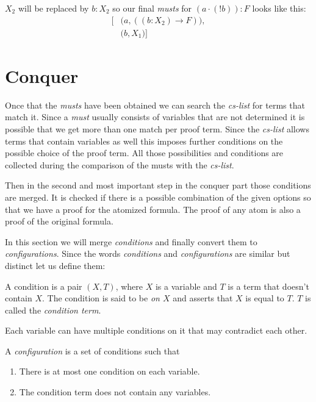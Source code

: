 $X_2$ will be replaced by $b:X_2$ so our final \emph{musts} for $(a \cdot (!b)):F$ looks like this: 
\begin{align*}\label{must-list}
 [ 	&\bigl( a, ((b:X_2) \rightarrow  F) \bigr) , \\
 	&\bigl( b, X_1 \bigr) ] 
\end{align*}

\section{Conquer}

Once that the \emph{musts} have been obtained we can search the \emph{cs-list} for terms that match it. Since a \emph{must} usually consists of variables that are not determined it is possible that we get more than one match per proof term. Since the \emph{cs-list} allows terms that contain variables as well this imposes further conditions on the possible choice of the proof term. All those possibilities and conditions are collected during the comparison of the musts with the \emph{cs-list}.

Then in the second and most important step in the conquer part those conditions are merged. It is checked if there is a possible combination of the given options so that we have a proof for the atomized formula. The proof of any atom is also a proof of the original formula.

In this section we will merge \emph{conditions} and finally convert them to \emph{configurations}. Since the words \emph{conditions} and \emph{configurations} are similar but distinct let us define them:

\begin{definition}[condition]
A condition is a pair $(X, T)$, where $X$ is a variable and $T$ is a term that doesn't contain $X$. The condition is said to be \emph{on $X$} and asserts that $X$ is equal to $T$. $T$ is called the \emph{condition term}.
\end{definition}
Each variable can have multiple conditions on it that may contradict each other.

\begin{definition}[configuration]
A \emph{configuration} is a set of conditions such that
\begin{enumerate}
	\item There is at most one condition on each variable.
	\item The condition term does not contain any variables.
\end{enumerate}
\end{definition}

